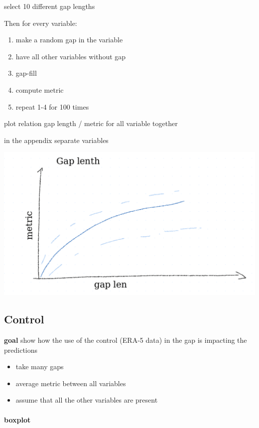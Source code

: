 \documentclass{article}
\let\Oldsubsection\subsection
\renewcommand{\subsection}{\FloatBarrier\Oldsubsection}
\begin{document}
select 10 different gap lengths

Then for every variable:
\begin{enumerate}
    \item make a random gap in the variable
    \item have all other variables without gap
    \item gap-fill
    \item compute metric
    \item repeat 1-4 for 100 times
\end{enumerate}

plot relation gap length / metric for all variable together

in the appendix separate variables

\includegraphics[width=\textwidth]{example_plot_gap_len}

\subsection{Control}

\textbf{goal} show how the use of the control (ERA-5 data) in the gap is impacting the predictions

\begin{itemize}
    \item take many gaps
    \item average metric between all variables
    \item assume that all the other variables are present
\end{itemize}

\paragraph{boxplot}
\end{document}
